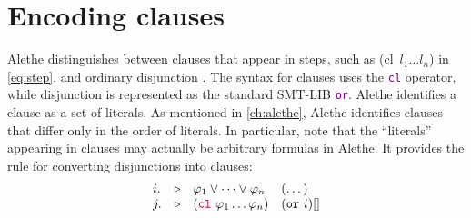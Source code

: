 \section{Encoding clauses}

Alethe distinguishes between clauses that appear in steps, such as \colorbox{green!30}{(cl~$l_1 \dots l_n$)} in \cref{eq:step}, and ordinary disjunction \cite[\S 4]{alethespec}.
The syntax for clauses uses the \textcolor{purple}{\texttt{cl}} operator, while disjunction is represented as the standard SMT-LIB \textcolor{purple}{\texttt{or}}.
Alethe identifies a clause as a set of literals. As mentioned in \cref{ch:alethe}, Alethe identifies clauses that differ only in the order of literals. In particular, note that the ``literals'' appearing in clauses may actually be arbitrary formulas in Alethe.
It provides the  rule for converting disjunctions into clauses:
\[
\begin{matrix*}[l]
  i. & \triangleright & \varphi_1 \lor \dots \lor \varphi_n  & (\dots) \\
  j. & \triangleright & (\texttt{\textcolor{purple}{cl}}~\varphi_1 \dots \varphi_n)  & (\kw{or}~i)[] \\
\end{matrix*}
\]

